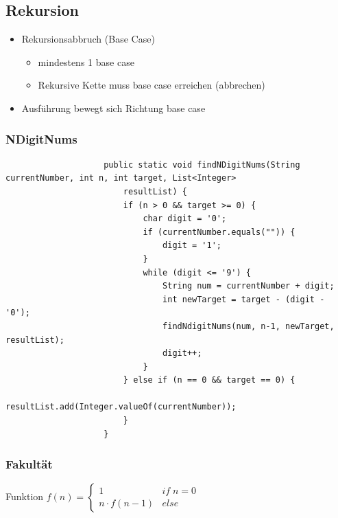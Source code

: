 \documentclass[a4paper, landscape, 8pt]{scrartcl}
\begin{document}
\begin{multicols*}{4}
            \subsection{Rekursion}
                \begin{itemize}
                    \item Rekursionsabbruch (Base Case)
                    \begin{itemize}
                        \item mindestens 1 base case
                        \item Rekursive Kette muss base case erreichen (abbrechen)
                    \end{itemize}
                    \item Ausführung bewegt sich Richtung base case
                \end{itemize}

                \subsubsection{NDigitNums}
                    \begin{lstlisting}
                    public static void findNDigitNums(String currentNumber, int n, int target, List<Integer>
                        resultList) {
                        if (n > 0 && target >= 0) {
                            char digit = '0';
                            if (currentNumber.equals("")) {
                                digit = '1';
                            }
                            while (digit <= '9') {
                                String num = currentNumber + digit;
                                int newTarget = target - (digit - '0');
                                findNdigitNums(num, n-1, newTarget, resultList);
                                digit++;
                            }
                        } else if (n == 0 && target == 0) {
                            resultList.add(Integer.valueOf(currentNumber));
                        }
                    }
                    \end{lstlisting}
        
                \subsubsection{Fakultät}
                    \textcolor{subsectioncolor}{Funktion}
                    \newline
                    $f(n) =
                    \begin{cases}
                        1 & if \; n=0 \\
                        n \cdot f(n-1) & else
                    \end{cases}$
                    \newline


\end{multicols*}
\end{document}
